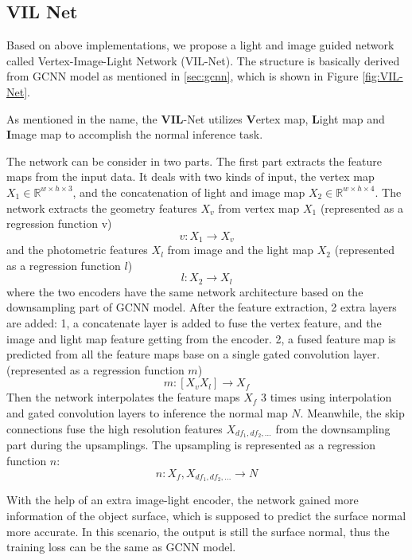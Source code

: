 \documentclass[border=15pt, multi, tikz]{article}
\begin{document}
\subsection{VIL Net}
Based on above implementations, we propose a light and image guided network called Vertex-Image-Light Network (VIL-Net). The structure is basically derived from GCNN model as mentioned in \ref{sec:gcnn}, which is shown in Figure 
\ref{fig:VIL-Net}.

As mentioned in the name, the \textbf{VIL}-Net utilizes \textbf{V}ertex map, \textbf{L}ight map and \textbf{I}mage map to accomplish the normal inference task. 

The network can be consider in two parts. The first part extracts the feature maps from the input data. It deals with two kinds of input, the vertex map $ X_1 \in \mathbb{R}^{w\times h\times3}$, and the concatenation of light and image map $ X_2 \in \mathbb{R}^{w\times h\times4} $. The network extracts the geometry features $ X_v $ from vertex map $ X_1 $ (represented as a regression function v)
\[ v: X_1 \rightarrow X_v \]
and the photometric features $ X_l $ from image and the light map $ X_2 $ (represented as a regression function $ l $)
\[ l: X_2 \rightarrow X_l \]
where the two encoders have the same network architecture based on the downsampling part of GCNN model. After the feature extraction, 2 extra layers are added: 1, a concatenate layer is added to fuse the vertex feature, and the image and light map feature getting from the encoder. 
2, a fused feature map is predicted from all the feature maps base on a single gated convolution layer. (represented as a regression function $ m $)
\[ m: [X_v X_l] \rightarrow X_f \]
Then the network interpolates the feature maps $ X_f $ 3 times using interpolation and gated convolution layers to inference the normal map $ N $. Meanwhile, the skip connections fuse the high resolution features $ X_{df_1, df_2, ...} $ from the downsampling part during the upsamplings. The upsampling is represented as a regression function $ n $:
\[ n: X_f, X_{df_1, df_2, ...} \rightarrow N \]

With the help of an extra image-light encoder, the network gained more information of the object surface, which is supposed to predict the surface normal more accurate. In this scenario, the output is still the surface normal, thus the training loss can be the same as GCNN model.
\end{document}
